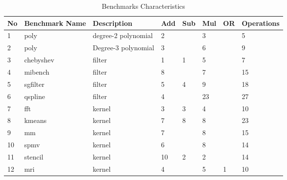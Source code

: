 \begin{table}[htbp]
	\centering
	\begin{adjustbox}{width=.9\textwidth}
		\small
	\begin{tabular}{llllllll}
		\toprule
		\textbf{No} & \textbf{Benchmark Name} & \textbf{Description} & \textbf{Add} & \textbf{Sub} & \textbf{Mul} & \textbf{OR} & \textbf{Operations} \\
		\midrule
		1     & poly  & degree-2 polynomial & 2     &       & 3     &       & 5 \\
		2     & poly  & Degree-3 polynomial & 3     &       & 6     &       & 9 \\
		\midrule
		3     & chebyshev & filter & 1     & 1     & 5     &       & 7 \\
		4     & mibench & filter & 8     &       & 7     &       & 15 \\
		5     & sgfilter & filter & 5     & 4     & 9     &       & 18 \\
		6     & qspline & filter & 4     &       & 23    &       & 27 \\
		\midrule
		7     & fft   & kernel & 3     & 3     & 4     &       & 10 \\
		8     & kmeans & kernel & 7     & 8     & 8     &       & 23 \\
		9     & mm    & kernel & 7     &       & 8     &       & 15 \\
		10    & spmv  & kernel & 6     &       & 8     &       & 14 \\
		11    & stencil & kernel & 10    & 2     & 2     &       & 14 \\
		12    & mri   & kernel & 4     &       & 5     & 1     & 10 \\
		\bottomrule
	\end{tabular}%
\end{adjustbox}%
    \caption{Benchmarks Characteristics}
	\label{b1:g1}%
\end{table}%